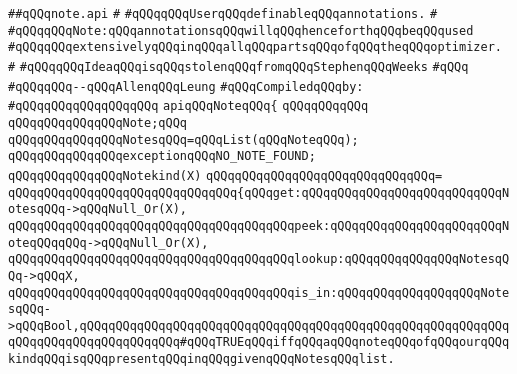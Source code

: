 \label{src/lib/src/note.api}
\verb|##qQQqnote.api|\newline
\verb|#|\newline
\verb|#qQQqqQQqUserqQQqdefinableqQQqannotations.|\newline
\verb|#|\newline
\verb|#qQQqqQQqNote:qQQqannotationsqQQqwillqQQqhenceforthqQQqbeqQQqused|\newline
\verb|#qQQqqQQqextensivelyqQQqinqQQqallqQQqpartsqQQqofqQQqtheqQQqoptimizer.|\newline
\verb|#|\newline
\verb|#qQQqqQQqIdeaqQQqisqQQqstolenqQQqfromqQQqStephenqQQqWeeks|\newline
\verb|#qQQq|\newline
\verb|#qQQqqQQq--qQQqAllenqQQqLeung|\newline
\newline
\verb|#qQQqCompiledqQQqby:|\newline
\verb|#qQQqqQQqqQQqqQQqqQQq|\newline
\newline
\verb|apiqQQqNoteqQQq{|\newline
\verb|qQQqqQQqqQQq|\newline
\verb|qQQqqQQqqQQqqQQqNote;qQQq|\newline
\verb|qQQqqQQqqQQqqQQqNotesqQQq=qQQqList(qQQqNoteqQQq);|\newline
\newline
\verb|qQQqqQQqqQQqqQQqexceptionqQQqNO_NOTE_FOUND;|\newline
\newline
\verb|qQQqqQQqqQQqqQQqNotekind(X)|\newline
\verb|qQQqqQQqqQQqqQQqqQQqqQQqqQQqqQQq=|\newline
\verb|qQQqqQQqqQQqqQQqqQQqqQQqqQQqqQQq{qQQqget:qQQqqQQqqQQqqQQqqQQqqQQqqQQqNotesqQQq->qQQqNull_Or(X),|\newline
\verb|qQQqqQQqqQQqqQQqqQQqqQQqqQQqqQQqqQQqqQQqpeek:qQQqqQQqqQQqqQQqqQQqqQQqNoteqQQqqQQq->qQQqNull_Or(X),|\newline
\verb|qQQqqQQqqQQqqQQqqQQqqQQqqQQqqQQqqQQqqQQqlookup:qQQqqQQqqQQqqQQqNotesqQQq->qQQqX,|\newline
\verb|qQQqqQQqqQQqqQQqqQQqqQQqqQQqqQQqqQQqqQQqis_in:qQQqqQQqqQQqqQQqqQQqNotesqQQq->qQQqBool,qQQqqQQqqQQqqQQqqQQqqQQqqQQqqQQqqQQqqQQqqQQqqQQqqQQqqQQqqQQqqQQqqQQqqQQqqQQqqQQqqQQq#qQQqTRUEqQQqiffqQQqaqQQqnoteqQQqofqQQqourqQQqkindqQQqisqQQqpresentqQQqinqQQqgivenqQQqNotesqQQqlist.|\newline
